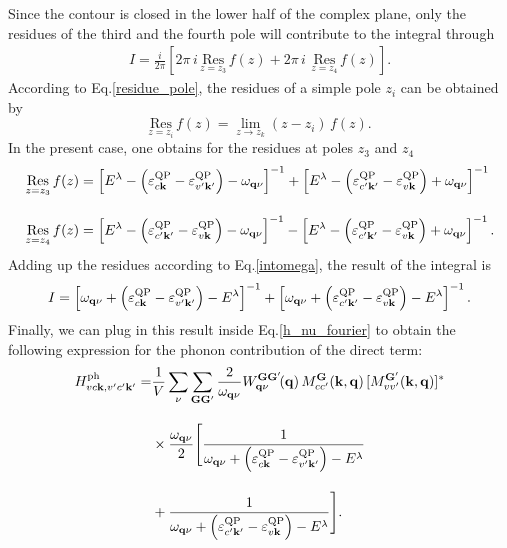 Since the contour is closed in the lower half of the complex plane, only the residues of the third and the fourth pole will contribute to the integral through
%
\begin{align}\label{intomega}
     I = \frac{i}{2\pi} \left[ 2\pi\,i\, \underset{z=z_3}{\text{Res}}\,f(z) + 2\pi\,i\,\ \underset{z=z_4}{\text{Res}}\,f(z)\right].
\end{align}
According to Eq.\;\eqref{residue_pole}, the residues of a simple pole $z_i$ can be obtained by 
%
\begin{equation}
    \underset{z=z_i}{\text{Res}}\,f(z) = \lim_{z\rightarrow z_k}(z-z_i)\,f(z).
\end{equation}
 In the present case, one obtains for the residues at poles $z_3$ and $z_4$ 
 \begin{align}
    \underset{z=z_3}{\text{Res}}\,f(z) & =\left[ E^\lambda - \left(\varepsilon^\text{QP}_{c\mathbf{k}} - \varepsilon^\text{QP}_{v'\mathbf{k'}}\right) - \omega_{\mathbf{q}\nu}\right]^{-1} + \left[  E^\lambda - \left(\varepsilon^\text{QP}_{c'\mathbf{k'}} - \varepsilon^\text{QP}_{v\mathbf{k}}\right) + \omega_{\mathbf{q}\nu}\right]^{-1} \\[10pt]
     \underset{z=z_4}{\text{Res}}\,f(z) &  =  \left[ E^\lambda - \left(\varepsilon^\text{QP}_{c'\mathbf{k'}} - \varepsilon^\text{QP}_{v\mathbf{k}}\right) - \omega_{\mathbf{q}\nu} \right]^{-1} - \left[ E^\lambda - \left(\varepsilon^\text{QP}_{c'\mathbf{k'}} - \varepsilon^\text{QP}_{v\mathbf{k}}\right) + \omega_{\mathbf{q}\nu}\right]^{-1}.
 \end{align}
 Adding up the residues according to Eq.\;\eqref{intomega}, the result of the integral is
 \begin{equation}
     I = \left[\omega_{\mathbf{q}\nu}  + \left(\varepsilon^\text{QP}_{c\mathbf{k}} - \varepsilon^\text{QP}_{v'\mathbf{k'}}\right) - E^\lambda  \right] ^{-1} + \left[ \omega_{\mathbf{q}\nu} + \left(\varepsilon^\text{QP}_{c'\mathbf{k'}} - \varepsilon^\text{QP}_{v\mathbf{k}}\right) - E^\lambda \right]^{-1}.
 \end{equation}
 \newpage Finally, we can plug in this result inside Eq.\;\eqref{h_nu_fourier} to obtain the following expression for the phonon contribution of the direct term:
%
\begin{equation}\label{h_dir_final}
\begin{aligned}
   H^\text{ph}_{vc\mathbf{k},v'c'\mathbf{k}'}  = &  \frac{1}{V}\sum_\nu\sum_{\mathbf{GG'}}\frac{2}{\omega_{\mathbf{q}\nu}} W_{\mathbf{q}\nu}^{\mathbf{G}\mathbf{G}'}\!(\mathbf{q})\,M^{\mathbf{G}}_{cc'}(\mathbf{k,q})\,[M^\mathbf{G'}_{vv'}(\mathbf{k,q})]^*\\[10pt]
     & \times \frac{\omega_{\mathbf{q}\nu}}{2}\Bigg[\frac{1}{\omega_{\mathbf{q}\nu}  + \left(\varepsilon^\text{QP}_{c\mathbf{k}} - \varepsilon^\text{QP}_{v'\mathbf{k'}}\right) - E^\lambda  } \\[10pt]
      & +  \frac{1}{  \omega_{\mathbf{q}\nu} + \left(\varepsilon^\text{QP}_{c'\mathbf{k'}} - \varepsilon^\text{QP}_{v\mathbf{k}}\right) -  E^\lambda }\Bigg].
\end{aligned}
\end{equation}
